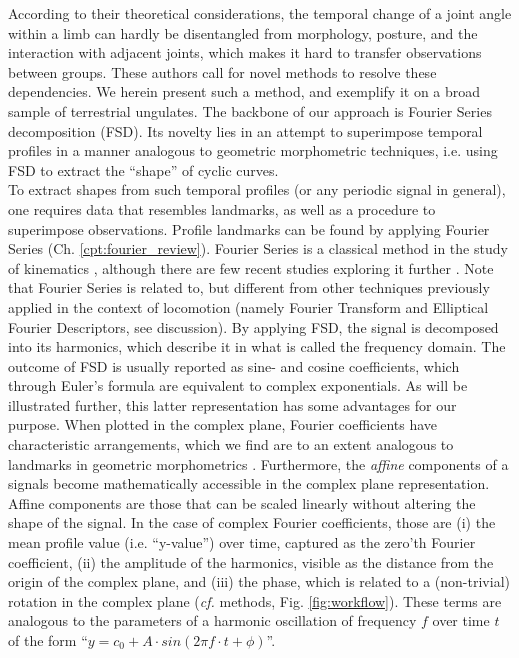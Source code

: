 According to their theoretical considerations, the temporal change of a joint angle within a limb can hardly be disentangled from morphology, posture, and the interaction with adjacent joints, which makes it hard to transfer observations between groups.
These authors call for novel methods to resolve these dependencies.
We herein present such a method, and exemplify it on a broad sample of terrestrial ungulates.
The backbone of our approach is Fourier Series decomposition (FSD).
Its novelty lies in an attempt to superimpose temporal profiles in a manner analogous to geometric morphometric techniques, i.e. using FSD to extract the ``shape'' of cyclic curves.
\\To extract shapes from such temporal profiles (or any periodic signal in general), one requires data that resembles landmarks, as well as a procedure to superimpose observations.
Profile landmarks can be found by applying Fourier Series (Ch. \ref{cpt:fourier_review}).
Fourier Series is a classical method in the study of kinematics \citep{Bernstein1927a,Bernstein1935}, although there are few recent studies exploring it further \citep{Pike2002,vanWeeren1992,Grasso2000,Webb2007}.
Note that Fourier Series is related to, but different from other techniques previously applied in the context of locomotion (namely Fourier Transform and Elliptical Fourier Descriptors, see discussion).
By applying FSD, the signal is decomposed into its harmonics, which describe it in what is called the frequency domain.
The outcome of FSD is usually reported as sine- and cosine coefficients, which through Euler's formula are equivalent to complex exponentials.
As will be illustrated further, this latter representation has some advantages for our purpose.
When plotted in the complex plane, Fourier coefficients have characteristic arrangements, which we find are to an extent analogous to landmarks in geometric morphometrics \citep{Bookstein1991,Kendall1989}.
Furthermore, the \textit{affine} components of a signals become mathematically accessible in the complex plane representation.
Affine components are those that can be scaled linearly without altering the shape of the signal.
In the case of complex Fourier coefficients, those are (i) the mean profile value (i.e. ``y-value'') over time, captured as the zero'th Fourier coefficient, (ii) the amplitude of the harmonics, visible as the distance from the origin of the complex plane, and (iii) the phase, which is related to a (non-trivial) rotation in the complex plane (\textit{cf.} methods, Fig. \ref{fig:workflow}).
These terms are analogous to the parameters of a harmonic oscillation of frequency $f$ over time $t$ of the form ``$y = c_0 + A\cdot sin(2\pi f\cdot t + \phi)$''.
